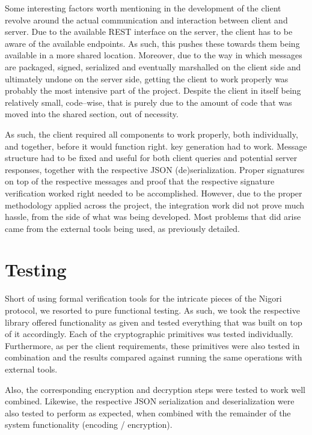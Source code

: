 Some interesting factors worth mentioning in the development of the client revolve around the actual communication and interaction between client and server.
Due to the available REST interface on the server, the client has to be aware of the available endpoints.
As such, this pushes these towards them being available in a more shared location.
Moreover, due to the way in which messages are packaged, signed, serialized and eventually marshalled on the client side and ultimately undone on the server side, getting the client to work properly was probably the most intensive part of the project.
Despite the client in itself being relatively small, code--wise, that is purely due to the amount of code that was moved into the shared section, out of necessity.

As such, the client required all components to work properly, both individually, and together, before it would function right.
 key generation had to work.
Message structure had to be fixed and useful for both client queries and potential server responses, together with the respective JSON (de)serialization.
Proper  signatures on top of the respective messages and proof that the respective  signature verification worked right needed to be accomplished.
However, due to the proper methodology applied across the project, the integration work did not prove much hassle, from the side of what was being developed.
Most problems that did arise came from the external tools being used, as previously detailed.

\section{Testing}
Short of using formal verification tools for the intricate pieces of the Nigori protocol, we resorted to pure functional testing.
As such, we took the respective library offered functionality as given and tested everything that was built on top of it accordingly.
Each of the cryptographic primitives was tested individually.
Furthermore, as per the client requirements, these primitives were also tested in combination and the results compared against running the same operations with external tools.

Also, the corresponding encryption and decryption steps were tested to work well combined.
Likewise, the respective JSON serialization and deserialization were also tested to perform as expected, when combined with the remainder of the system functionality (encoding / encryption).

